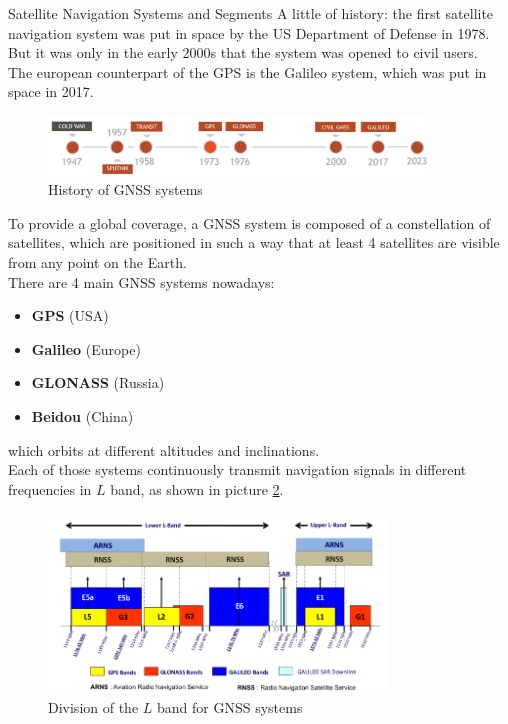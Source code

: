   \begin{section}{Satellite Navigation Systems and Segments}
    A little of history: the first satellite navigation system was put in space by the US Department
    of Defense in 1978. But it was only in the early 2000s that the system was opened to civil users.\\
    The european counterpart of the GPS is the Galileo system, which was put in space in 2017.\\
    \begin{figure}[h]
      \centering
      \includegraphics[width=0.9\textwidth]{img/wireless/GNSS history.png}
      \caption{History of GNSS systems}
      \label{fig:GNSS systems history}
    \end{figure}
    To provide a global coverage, a GNSS system is composed of a constellation of satellites, which
    are positioned in such a way that at least 4 satellites are visible from any point on the Earth.\\

    There are 4 main GNSS systems nowadays:
    \begin{itemize}
      \item \textbf{GPS} (USA)
      \item \textbf{Galileo} (Europe)
      \item \textbf{GLONASS} (Russia)
      \item \textbf{Beidou} (China)
    \end{itemize}
    which orbits at different altitudes and inclinations.\\
    Each of those systems  continuously transmit navigation signals in different frequencies in $L$ 
    band, as shown in picture \ref{fig:GNSS band}.\\

    \begin{figure}[h]
      \centering
      \includegraphics[width=0.8\textwidth]{img/wireless/GNSS band.png}
      \caption{Division of the $L$ band for GNSS systems}
      \label{fig:GNSS band}
    \end{figure}


\end{section}
